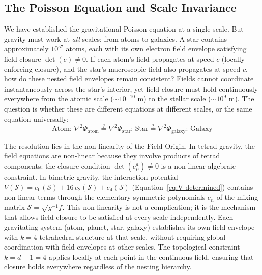 
\subsection{The Poisson Equation and Scale Invariance}
\label{subsec:poisson-scale-invariance}


We have established the gravitational Poisson equation at a single scale. But gravity must work at \emph{all} scales: from atoms to galaxies. A star contains approximately $10^{57}$ atoms, each with its own electron field envelope satisfying field closure $\det(e) \neq 0$. If each atom's field propagates at speed $c$ (locally enforcing closure), and the star's macroscopic field also propagates at speed $c$, how do these nested field envelopes remain consistent? Fields cannot coordinate instantaneously across the star's interior, yet field closure must hold continuously everywhere from the atomic scale ($\sim 10^{-10}$ m) to the stellar scale ($\sim 10^9$ m). The question is whether these are different equations at different scales, or the same equation universally:
\begin{equation}
\text{Atom: } \nabla^2\Phi_{\text{atom}} \stackrel{?}{=} \nabla^2\Phi_{\text{star}} \text{: Star} \stackrel{?}{=} \nabla^2\Phi_{\text{galaxy}} \text{: Galaxy}
\label{eq:scaling-question}
\end{equation}

The resolution lies in the non-linearity of the Field Origin. In tetrad gravity, the field equations are non-linear because they involve products of tetrad components: the closure condition $\det(e_\mu^a) \neq 0$ is a non-linear algebraic constraint. In bimetric gravity, the interaction potential $V(\mathcal{S}) = e_0(\mathcal{S}) + 16\,e_2(\mathcal{S}) + e_4(\mathcal{S})$ (Equation~\ref{eq:V-determined}) contains non-linear terms through the elementary symmetric polynomials $e_n$ of the mixing matrix $\mathcal{S} = \sqrt{g^{-1}f}$. This non-linearity is not a complication; it is the mechanism that allows field closure to be satisfied at every scale independently. Each gravitating system (atom, planet, star, galaxy) establishes its own field envelope with $k=4$ tetrahedral structure at that scale, without requiring global coordination with field envelopes at other scales. The topological constraint $k = d+1 = 4$ applies locally at each point in the continuous field, ensuring that closure holds everywhere regardless of the nesting hierarchy.

